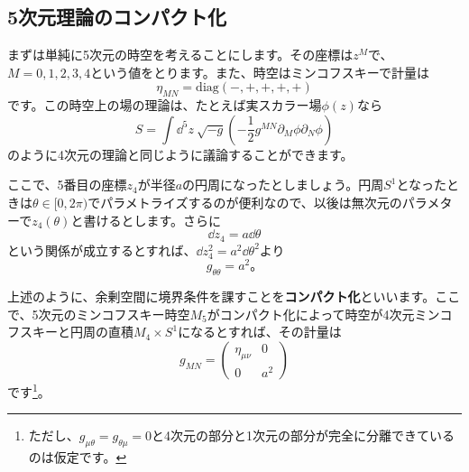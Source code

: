 \documentclass[unicode,a4paper,10pt]{ltjsarticle}
\begin{document}
\subsection{5次元理論のコンパクト化}

まずは単純に5次元の時空を考えることにします。その座標は$z^{M}$で、$M=0,1,2,3,4$という値をとります。また、時空はミンコフスキーで計量は
\begin{equation}
   \eta_{MN}
   =
   \mathrm{diag}(-,+,+,+,+)
\end{equation}
です。この時空上の場の理論は、たとえば実スカラー場$\phi(z)$なら
\begin{equation}
   S
   =
   \int\dd^5 z\ \sqrt{-g}
   \left(  
      -\frac{1}{2}
      g^{MN}\partial_{M}\phi\partial_{N}\phi
   \right)
   \label{eqn:action_5d_real_scalar}
\end{equation}
のように4次元の理論と同じように議論することができます。

ここで、5番目の座標$z_{4}$が半径$a$の円周になったとしましょう。円周$S^{1}$となったときは$\theta\in[0,2\pi)$でパラメトライズするのが便利なので、以後は無次元のパラメターで$z_{4}(\theta)$と書けるとします。さらに
\begin{equation}
   \dd z_{4}
   =
   a\dd \theta
\end{equation}
という関係が成立するとすれば、$\dd z_{4}^2=a^2\dd \theta^2$より
\begin{equation}
   g_{\theta\theta}=a^2
   。
\end{equation}

上述のように、余剰空間に境界条件を課すことを\textbf{コンパクト化}といいます。ここで、5次元のミンコフスキー時空$M_{5}$がコンパクト化によって時空が4次元ミンコフスキーと円周の直積$M_{4}\times S^{1}$になるとすれば、その計量は
\begin{equation}
   g_{MN}
   =
   \begin{pmatrix}
      \eta_{\mu\nu} & 0 \\
      0 & a^2
   \end{pmatrix}
\end{equation}
です\footnote{
   ただし、$g_{\mu\theta}=g_{\theta\mu}=0$と4次元の部分と1次元の部分が完全に分離できているのは仮定です。
}。
\end{document}
